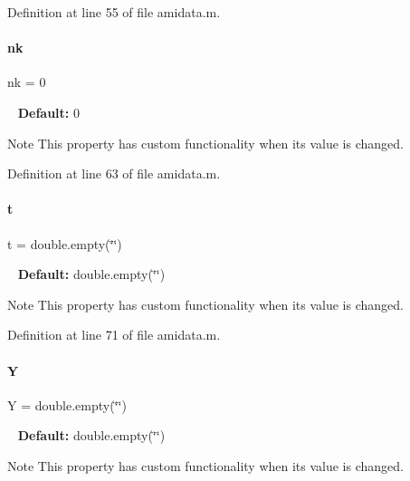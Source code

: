 Definition at line 55 of file amidata.\+m.

\mbox{\label{classamidata_afd6bea572754e0c3c320664bdccf0200}} 
\paragraph{\texorpdfstring{nk}{nk}}
{\footnotesize\ttfamily nk = 0}

~\newline
{\bfseries{Default\+:}} 0

\begin{DoxyNote}{Note}
This property has custom functionality when its value is changed. 
\end{DoxyNote}


Definition at line 63 of file amidata.\+m.

\mbox{\label{classamidata_aaccc9105df5383111407fd5b41255e23}} 
\paragraph{\texorpdfstring{t}{t}}
{\footnotesize\ttfamily t = double.\+empty(\char`\"{}\char`\"{})}

~\newline
{\bfseries{Default\+:}} double.\+empty(\char`\"{}\char`\"{})

\begin{DoxyNote}{Note}
This property has custom functionality when its value is changed. 
\end{DoxyNote}


Definition at line 71 of file amidata.\+m.

\mbox{\label{classamidata_a0867f43e27585e019c13f7f4b7c4ab6b}} 
\paragraph{\texorpdfstring{Y}{Y}}
{\footnotesize\ttfamily Y = double.\+empty(\char`\"{}\char`\"{})}

~\newline
{\bfseries{Default\+:}} double.\+empty(\char`\"{}\char`\"{})

\begin{DoxyNote}{Note}
This property has custom functionality when its value is changed. 
\end{DoxyNote}


